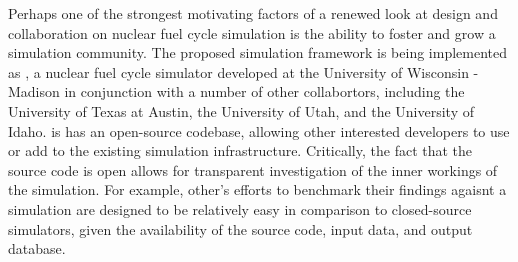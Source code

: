 Perhaps one of the strongest motivating factors of a renewed look at design and
collaboration on nuclear fuel cycle simulation is the ability to foster and grow
a simulation community. The proposed simulation framework is being implemented
as \Cyclus \cite{cyclus2012}, a nuclear fuel cycle simulator developed at the
University of Wisconsin - Madison in conjunction with a number of other
collabortors, including the University of Texas at Austin, the University of
Utah, and the University of Idaho. \Cyclus is has an open-source codebase,
allowing other interested developers to use or add to the existing simulation
infrastructure. Critically, the fact that the source code is open allows for
transparent investigation of the inner workings of the simulation. For example,
other's efforts to benchmark their findings agaisnt a \Cyclus simulation are
designed to be relatively easy in comparison to closed-source simulators, given
the availability of the source code, input data, and output database.
